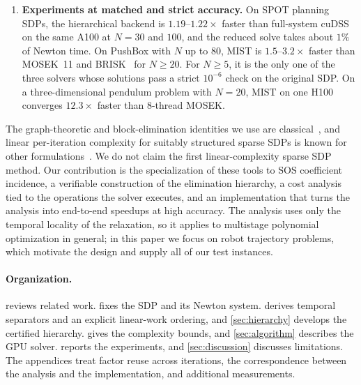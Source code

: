 \begin{enumerate}[leftmargin=*,itemsep=2pt]
  planning, batched native supernodal partial factorization of repeated stage
  patterns, and a reduced solve by dense Cholesky, cyclic reduction or sparse
  factorization. Every direction is checked against the full operator, and the
  backend falls back to a general factorization when a check fails.
\item \textbf{Experiments at matched and strict accuracy.} On SPOT planning
  SDPs, the hierarchical backend is $1.19$--$1.22\times$ faster than full-system
  cuDSS on the same A100 at $N=30$ and $100$, and the reduced solve takes about
  $1\%$ of Newton time. On PushBox with $N$ up to $80$, MIST is
  $1.5$--$3.2\times$ faster than MOSEK~11 and BRISK~\cite{brisk} for $N\ge20$.
  For $N\ge5$, it is the only one of the three solvers whose solutions pass a
  strict $10^{-6}$ check on the original SDP. On a three-dimensional pendulum
  problem with $N=20$, MIST on one H100 converges $12.3\times$ faster than
  8-thread MOSEK.
\end{enumerate}

The graph-theoretic and block-elimination identities we use are
classical~\cite{rose1976algorithmic,george1973nested,vandenberghe2015chordal},
and linear per-iteration complexity for suitably structured sparse SDPs is known
for other formulations~\cite{zhang2020clique,zhang2024chordal}. We do not claim
the first linear-complexity sparse SDP method. Our contribution is the
specialization of these tools to SOS coefficient incidence, a verifiable
construction of the elimination hierarchy, a cost analysis tied to the
operations the solver executes, and an implementation that turns the analysis
into end-to-end speedups at high accuracy. The analysis uses only the temporal
locality of the relaxation, so it applies to multistage polynomial optimization
in general; in this paper we focus on robot trajectory problems, which motivate
the design and supply all of our test instances.

\paragraph{Organization.}
 reviews related work.  fixes the SDP and
its Newton system.  derives temporal separators and an
explicit linear-work ordering, and \cref{sec:hierarchy} develops the certified
hierarchy.  gives the complexity bounds, and
\cref{sec:algorithm} describes the GPU solver.  reports
the experiments, and \cref{sec:discussion} discusses limitations. The appendices
treat factor reuse across iterations, the correspondence between the analysis and
the implementation, and additional measurements.
